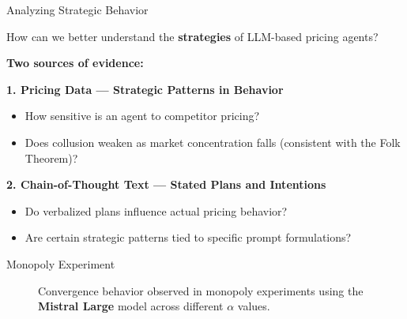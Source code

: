 \documentclass[10pt, aspectratio=169]{beamer}
\begin{document}
\begin{frame}{Analyzing Strategic Behavior}

\begin{center}
\begin{tcolorbox}[colback=gray!10, colframe=black, width=0.9\textwidth]
How can we better understand the \textbf{strategies} of LLM-based pricing agents?
\end{tcolorbox}
\end{center}

\textbf{Two sources of evidence:}

\vspace{0.5em}
\textbf{1. Pricing Data — Strategic Patterns in Behavior}
\begin{itemize}
    \item How sensitive is an agent to competitor pricing?
    \item Does collusion weaken as market concentration falls (consistent with the Folk Theorem)?
\end{itemize}

\vspace{0.5em}
\textbf{2. Chain-of-Thought Text — Stated Plans and Intentions}
\begin{itemize}
    \item Do verbalized plans influence actual pricing behavior?
    \item Are certain strategic patterns tied to specific prompt formulations?
\end{itemize}

\end{frame}


\begin{frame}{Monopoly Experiment}\label{}
\begin{figure}[htpb!]
    \centering
    
    \caption{Convergence behavior observed in monopoly experiments using the \textbf{Mistral Large} model across different $\alpha$ values.}
    \label{fig:monopoly_convergence}
\end{figure}
\hfill\hyperlink{app:calvano}{}
\end{frame}
\end{document}
